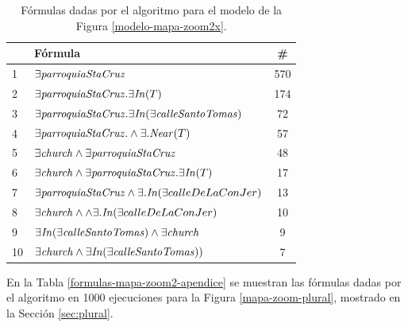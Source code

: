 \begin{table}[h]
\begin{center}
\begin{tabular}{|l|l|c|}
\hline
&F\'ormula                           &  \# \\ \hline \hline
1& $\exists \mathit{parroquiaStaCruz}$& 570\\ \hline

2& $\exists \mathit{parroquiaStaCruz}. \exists \mathit{In}(T)$& 174\\ \hline
3& $\exists \mathit{parroquiaStaCruz}. \exists \mathit{In}(\exists \mathit{calleSantoTomas})$& 72\\ \hline
4& $\exists \mathit{parroquiaStaCruz}. \land \exists.\mathit{Near}(T)$& 57\\ \hline

5& $\exists \mathit{church} \land \exists \mathit{parroquiaStaCruz}$& 48\\ \hline
6& $\exists \mathit{church} \land \exists \mathit{parroquiaStaCruz}. \exists \mathit{In}(T)$& 17\\ \hline
7& $\exists \mathit{parroquiaStaCruz} \land \exists. \mathit{In}(\exists calleDeLaConJer)$& 13\\ \hline
8& $\exists \mathit{church} \land \land \exists. \mathit{In}(\exists calleDeLaConJer) $&10\\ \hline

9& $\exists \mathit{In}(\exists \mathit{calleSantoTomas}) \land \exists \mathit{church}$&9\\ \hline

10& $\exists \mathit{church} \land \exists \mathit{In}(\exists \mathit{calleSantoTomas}))$&7\\ \hline

\end{tabular}

\caption{F\'ormulas dadas por el algoritmo para el modelo de la Figura \protect\ref{modelo-mapa-zoom2x}.}\label{formulas-mapa-zoom2x-apendice}
\end{center}
\end{table}




En la Tabla \ref{formulas-mapa-zoom2-apendice} se muestran las f\'ormulas dadas por el algoritmo en 1000 ejecuciones para la Figura \ref{mapa-zoom-plural}, mostrado en la Secci\'on \ref{sec:plural}. 

